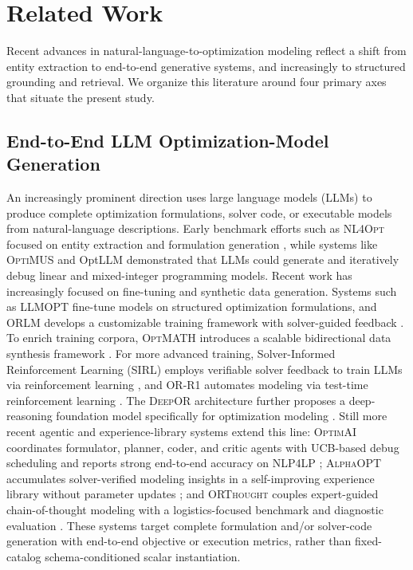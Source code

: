 \documentclass[pdflatex,sn-basic,Numbered]{sn-jnl}
\begin{document}
\section{Related Work}
\label{sec:related_work}

Recent advances in natural-language-to-optimization modeling reflect a shift from entity extraction to end-to-end generative systems, and increasingly to structured grounding and retrieval. We organize this literature around four primary axes that situate the present study.

\subsection{End-to-End LLM Optimization-Model Generation}
\label{subsec:rw_llm_generation}

An increasingly prominent direction uses large language models (LLMs) to produce complete optimization formulations, solver code, or executable models from natural-language descriptions. Early benchmark efforts such as \textsc{NL4Opt} focused on entity extraction and formulation generation \cite{ramamonjison2023nl4opt}, while systems like \textsc{OptiMUS} \cite{ahmaditeshnizi2024optimus_icml} and OptLLM \cite{zhang2024optllm} demonstrated that LLMs could generate and iteratively debug linear and mixed-integer programming models. Recent work has increasingly focused on fine-tuning and synthetic data generation. Systems such as \textsc{LLMOPT} \cite{jiang2025llmopt} fine-tune models on structured optimization formulations, and \textsc{ORLM} develops a customizable training framework with solver-guided feedback \cite{huang2025orlm}. To enrich training corpora, \textsc{OptMATH} introduces a scalable bidirectional data synthesis framework \cite{lu2025optmath}. For more advanced training, Solver-Informed Reinforcement Learning (SIRL) employs verifiable solver feedback to train LLMs via reinforcement learning \cite{chen2025solver}, and \textsc{OR-R1} automates modeling via test-time reinforcement learning \cite{ding2026orr1}. The \textsc{DeepOR} architecture further proposes a deep-reasoning foundation model specifically for optimization modeling \cite{xiao2026deepor}. Still more recent agentic and experience-library systems extend this line: \textsc{OptimAI} coordinates formulator, planner, coder, and critic agents with UCB-based debug scheduling and reports strong end-to-end accuracy on \textsc{NLP4LP} \cite{thind2025optimai}; \textsc{AlphaOPT} accumulates solver-verified modeling insights in a self-improving experience library without parameter updates \cite{kong2025alphaopt}; and \textsc{ORThought} couples expert-guided chain-of-thought modeling with a logistics-focused benchmark and diagnostic evaluation \cite{yang2026orthought}. These systems target complete formulation and/or solver-code generation with end-to-end objective or execution metrics, rather than fixed-catalog schema-conditioned scalar instantiation.
\end{document}
